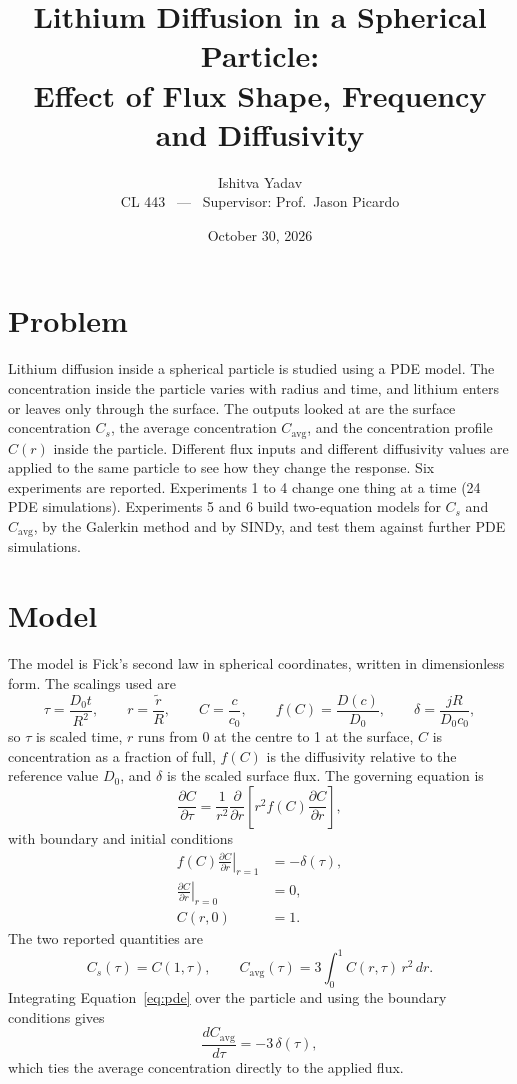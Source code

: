 \documentclass[11pt,a4paper]{article}
\title{Lithium Diffusion in a Spherical Particle:\\Effect of Flux Shape, Frequency and Diffusivity}
\author{Ishitva Yadav\\CL 443 \ --- \ Supervisor: Prof.\ Jason Picardo}
\date{October 30, 2026}
\newcommand{\avg}{\mathrm{avg}}
\begin{document}
\maketitle

\section{Problem}
Lithium diffusion inside a spherical particle is studied using a PDE model. The concentration inside the particle varies with radius and time, and lithium enters or leaves only through the surface. The outputs looked at are the surface concentration $C_s$, the average concentration $C_\avg$, and the concentration profile $C(r)$ inside the particle. Different flux inputs and different diffusivity values are applied to the same particle to see how they change the response. Six experiments are reported. Experiments 1 to 4 change one thing at a time (24 PDE simulations). Experiments 5 and 6 build two-equation models for $C_s$ and $C_\avg$, by the Galerkin method and by SINDy, and test them against further PDE simulations.

\section{Model}
The model is Fick's second law in spherical coordinates, written in dimensionless form. The scalings used are
\begin{equation}
  \tau = \frac{D_0 t}{R^2},\qquad r=\frac{\tilde r}{R},\qquad C=\frac{c}{c_0},\qquad f(C)=\frac{D(c)}{D_0},\qquad \delta = \frac{jR}{D_0c_0},
\end{equation}
so $\tau$ is scaled time, $r$ runs from 0 at the centre to 1 at the surface, $C$ is concentration as a fraction of full, $f(C)$ is the diffusivity relative to the reference value $D_0$, and $\delta$ is the scaled surface flux. The governing equation is
\begin{equation}\label{eq:pde}
  \frac{\partial C}{\partial\tau} = \frac{1}{r^2}\frac{\partial}{\partial r}\left[r^2 f(C)\frac{\partial C}{\partial r}\right],
\end{equation}
with boundary and initial conditions
\begin{align}
  f(C)\left.\frac{\partial C}{\partial r}\right|_{r=1} &= -\delta(\tau),\\
  \left.\frac{\partial C}{\partial r}\right|_{r=0} &= 0,\\
  C(r,0) &= 1.
\end{align}
The two reported quantities are
\begin{equation}
  C_s(\tau) = C(1,\tau),\qquad C_\avg(\tau) = 3\int_0^1 C(r,\tau)\,r^2\,dr.
\end{equation}
Integrating Equation~\eqref{eq:pde} over the particle and using the boundary conditions gives
\begin{equation}\label{eq:massbal}
  \frac{dC_\avg}{d\tau} = -3\,\delta(\tau),
\end{equation}
which ties the average concentration directly to the applied flux.
\end{document}
